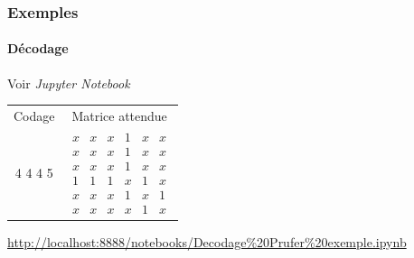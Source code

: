 \documentclass[11pt]{beamer}
\begin{document}
\begin{frame}
\frametitle{Exemples}
\framesubtitle{Décodage}

\begin{center}
Voir \textit{Jupyter Notebook}\\
\vspace{0.5cm}
\begin{table}[]
\centering
\begin{tabular}{c|c}
 Codage& Matrice attendue \\
 4 4 4 5& $\begin{array}{cccccc}
x & x & x & 1 & x & x \\ 
x & x & x & 1 & x & x \\ 
x & x & x & 1 & x & x \\ 
1 & 1 & 1 & x & 1 & x \\ 
x & x & x & 1 & x & 1 \\ 
x & x & x & x & 1 & x
\end{array}$
\end{tabular}
\end{table}
\vspace{1cm}
\tiny{\url{http://localhost:8888/notebooks/Decodage\%20Prufer\%20exemple.ipynb}}
\end{center}
\end{frame}
\end{document}
